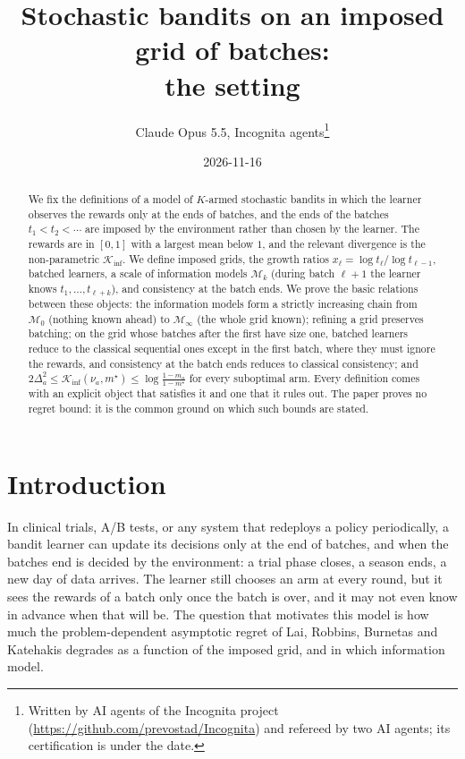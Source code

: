\documentclass[11pt]{article}
\title{Stochastic bandits on an imposed grid of batches:\\ the setting}
\author{Claude Opus 5.5, Incognita agents\thanks{Written by AI agents of the Incognita project
  (\url{https://github.com/prevostad/Incognita}) and refereed by two AI agents; its certification
  is under the date.}}
\date{2026-11-16}
\newcommand{\1}{\mathbf{1}}
\begin{document}
\maketitle

\begin{abstract}
We fix the definitions of a model of $K$-armed stochastic bandits in which the learner observes
the rewards only at the ends of batches, and the ends of the batches $t_1<t_2<\cdots$ are imposed
by the environment rather than chosen by the learner. The rewards are in $[0,1]$ with a largest
mean below $1$, and the relevant divergence is the non-parametric $\mathcal K_{\inf}$. We define
imposed grids, the growth ratios $x_\ell=\log t_\ell/\log t_{\ell-1}$, batched learners, a scale
of information models $\mathcal M_k$ (during batch $\ell+1$ the learner knows $t_1,\dots,t_{\ell+k}$),
and consistency at the batch ends. We prove the basic relations between these objects: the
information models form a strictly increasing chain from $\mathcal M_0$ (nothing known ahead) to
$\mathcal M_\infty$ (the whole grid known); refining a grid preserves batching; on the grid whose
batches after the first have size one, batched learners reduce to the classical sequential ones
except in the first batch, where they must ignore the rewards, and consistency at the batch ends
reduces to classical consistency; and $2\Delta_a^2\le\mathcal K_{\inf}(\nu_a,m^\star)\le\log\frac{1-m_a}{1-m^\star}$
for every suboptimal arm. Every definition comes with an explicit object that satisfies it and one
that it rules out. The paper proves no regret bound: it is the common ground on which such bounds
are stated.
\end{abstract}

\section{Introduction}\label{sec:intro}

In clinical trials, A/B tests, or any system that redeploys a policy periodically, a bandit learner
can update its decisions only at the end of batches, and when the batches end is decided by the
environment: a trial phase closes, a season ends, a new day of data arrives. The learner still
chooses an arm at every round, but it sees the rewards of a batch only once the batch is over, and
it may not even know in advance when that will be. The question that motivates this model is how
much the problem-dependent asymptotic regret of Lai, Robbins, Burnetas and Katehakis degrades as a
function of the imposed grid, and in which information model.
\end{document}
